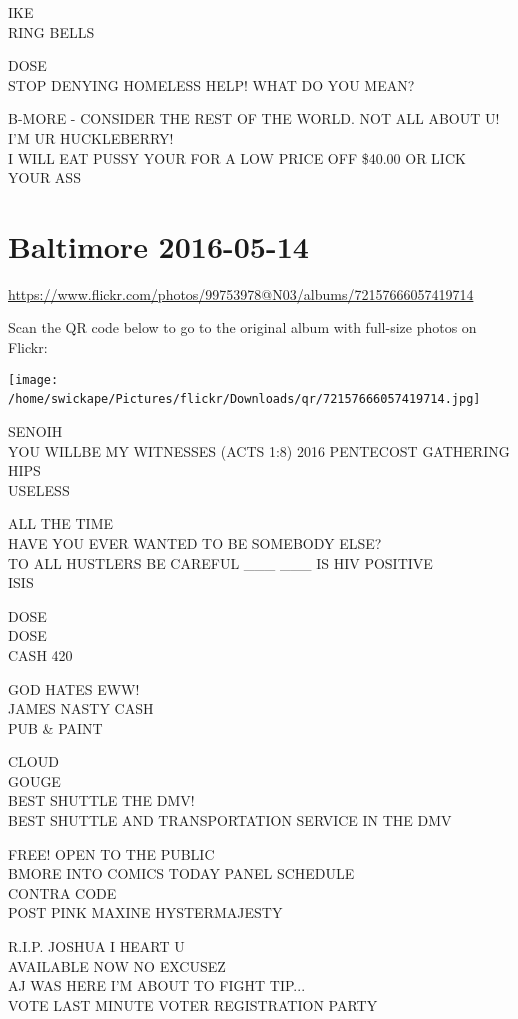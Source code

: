 \documentclass[10pt,letterpaper]{article}
\begin{document}
IKE\\
RING BELLS

DOSE\\
STOP DENYING HOMELESS HELP!  WHAT DO YOU MEAN?

B{-}MORE {-} CONSIDER THE REST OF THE WORLD.  NOT ALL ABOUT U!  I'M UR HUCKLEBERRY!\\
I WILL EAT PUSSY YOUR FOR A LOW PRICE OFF \$40.00 OR LICK YOUR ASS
\

\section*{Baltimore 2016-05-14}

\url{https://www.flickr.com/photos/99753978@N03/albums/72157666057419714}

Scan the QR code below to go to the original album with full-size photos on Flickr:

\texttt{[image: /home/swickape/Pictures/flickr/Downloads/qr/72157666057419714.jpg]}
\

SENOIH\\
YOU WILLBE MY WITNESSES (ACTS 1:8) 2016 PENTECOST GATHERING\\
HIPS\\
USELESS

ALL THE TIME\\
HAVE YOU EVER WANTED TO BE SOMEBODY ELSE?\\
TO ALL HUSTLERS BE CAREFUL \_\_\_ \_\_\_ IS HIV POSITIVE\\
ISIS

DOSE\\
DOSE\\
CASH 420

GOD HATES EWW!\\
JAMES NASTY CASH\\
PUB \& PAINT

CLOUD\\
GOUGE\\
BEST SHUTTLE THE DMV!\\
BEST SHUTTLE AND TRANSPORTATION SERVICE IN THE DMV

FREE!  OPEN TO THE PUBLIC\\
BMORE INTO COMICS TODAY PANEL SCHEDULE\\
CONTRA CODE\\
POST PINK MAXINE HYSTERMAJESTY

R.I.P. JOSHUA I HEART U\\
AVAILABLE NOW NO EXCUSEZ\\
AJ WAS HERE I'M ABOUT TO FIGHT TIP...\\
VOTE LAST MINUTE VOTER REGISTRATION PARTY
\end{document}
